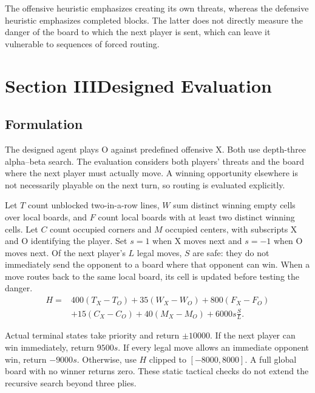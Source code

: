 \documentclass[UTF8,fontset=fandol,11pt,a4paper]{ctexart}
\begin{document}
The offensive heuristic emphasizes creating its own threats, whereas the
defensive heuristic emphasizes completed blocks. The latter does not
directly measure the danger of the board to which the next player is sent,
which can leave it vulnerable to sequences of forced routing.




\clearpage
\section{Section III\quad Designed Evaluation}
\subsection{Formulation}
The designed agent plays O against predefined offensive X. Both use
depth-three alpha--beta search. The evaluation considers both players'
threats and the board where the next player must actually move. A winning
opportunity elsewhere is not necessarily playable on the next turn, so
routing is evaluated explicitly.

Let $T$ count unblocked two-in-a-row lines, $W$ sum distinct winning empty
cells over local boards, and $F$ count local boards with at least two
distinct winning cells. Let $C$ count occupied corners and $M$ occupied
centers, with subscripts X and O identifying the player. Set $s=1$ when X
moves next and $s=-1$ when O moves next. Of the next player's $L$ legal
moves, $S$ are safe: they do not immediately send the opponent to a board
where that opponent can win. When a move routes back to the same local
board, its cell is updated before testing the danger.
\begin{align*}
H={}&400(T_X-T_O)+35(W_X-W_O)+800(F_X-F_O)\\
   &+15(C_X-C_O)+40(M_X-M_O)+6000s\frac{S}{L}.
\end{align*}

Actual terminal states take priority and return $\pm10000$. If the next
player can win immediately, return $9500s$. If every legal move allows an
immediate opponent win, return $-9000s$. Otherwise, use $H$ clipped to
$[-8000,8000]$. A full global board with no winner returns zero. These
static tactical checks do not extend the recursive search beyond three plies.
\end{document}
